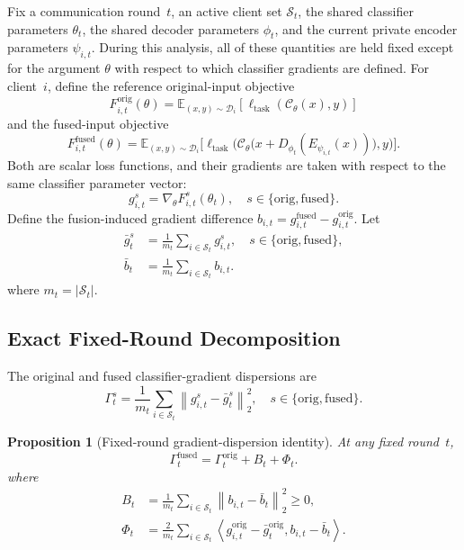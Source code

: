 \documentclass[twoside]{article}
\theoremstyle{thmstyleone}%
\newtheorem{proposition}[theorem]{Proposition}%
\theoremstyle{thmstyletwo}%
\theoremstyle{thmstylethree}%
\begin{document}
Fix a communication round~$t$, an active client set $\mathcal{S}_t$, the shared
classifier parameters $\theta_t$, the shared decoder parameters $\phi_t$, and
the current private encoder parameters $\psi_{i,t}$. During this analysis, all
of these quantities are held fixed except for the argument $\theta$ with
respect to which classifier gradients are defined.
For client~$i$, define the reference original-input objective
\begin{equation*}
F_{i,t}^{\mathrm{orig}}(\theta)
=
\mathbb{E}_{(x,y)\sim\mathcal{D}_i}
\left[
\ell_{\mathrm{task}}
\left(
\mathcal{C}_{\theta}(x),y
\right)
\right]
\end{equation*}
and the fused-input objective
\begin{equation*}
F_{i,t}^{\mathrm{fused}}(\theta)
=\mathbb{E}_{(x,y)\sim\mathcal D_i}
\bigl[\ell_{\mathrm{task}}\bigl(
\mathcal C_{\theta}\bigl(x+D_{\phi_t}(E_{\psi_{i,t}}(x))\bigr),y
\bigr)\bigr].
\end{equation*}
Both are scalar loss functions, and their gradients are taken with respect to
the same classifier parameter vector:
\[
g_{i,t}^{s}=\nabla_{\theta}F_{i,t}^{s}(\theta_t),
\quad s\in\{\mathrm{orig},\mathrm{fused}\}.
\]
Define the fusion-induced gradient difference
$b_{i,t}=g_{i,t}^{\mathrm{fused}}-g_{i,t}^{\mathrm{orig}}$.
Let
\begin{equation*}
\begin{aligned}
\bar{g}_t^{s}
&= \frac{1}{m_t}
   \sum_{i\in\mathcal{S}_t} g_{i,t}^{s},
   \quad s\in\{\mathrm{orig},\mathrm{fused}\},\\
\bar{b}_t
&= \frac{1}{m_t}
   \sum_{i\in\mathcal{S}_t} b_{i,t}.
\end{aligned}
\end{equation*}
where $m_t=|\mathcal{S}_t|$.

\subsection{Exact Fixed-Round Decomposition}

The original and fused classifier-gradient dispersions are
\[
\Gamma_t^s=\frac{1}{m_t}\sum_{i\in\mathcal S_t}
\left\|g_{i,t}^s-\bar g_t^s\right\|_2^2,
\quad s\in\{\mathrm{orig},\mathrm{fused}\}.
\]

\begin{proposition}[Fixed-round gradient-dispersion identity]
\label{prop:fixed_round_decomposition}
At any fixed round~$t$,
\begin{equation}
\label{eq:exact_decomp}
\Gamma_t^{\mathrm{fused}}
=
\Gamma_t^{\mathrm{orig}}
+
B_t
+
\Phi_t.
\end{equation}
where
\begin{align*}
B_t
&=
\frac{1}{m_t}
\sum_{i\in\mathcal{S}_t}
\left\|
b_{i,t}-\bar{b}_t
\right\|_2^2
\geq 0,\\
\Phi_t
&=
\frac{2}{m_t}
\sum_{i\in\mathcal{S}_t}
\left\langle
g_{i,t}^{\mathrm{orig}}-\bar{g}_t^{\mathrm{orig}},
b_{i,t}-\bar{b}_t
\right\rangle .
\end{align*}
\end{proposition}
\end{document}
